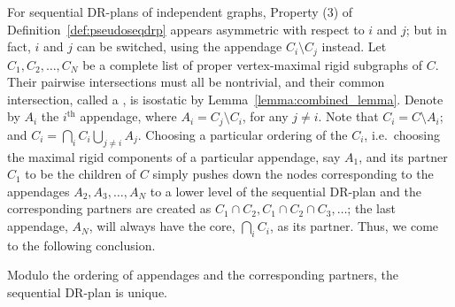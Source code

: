 For sequential DR-plans of independent graphs, Property (3) of Definition~\ref{def:pseudoseqdrp} appears asymmetric with respect to $i$ and $j$; but in fact, $i$ and $j$ can be switched, using the appendage $C_i\setminus C_j$ instead. Let $C_1, C_2, \ldots, C_N$ be a complete list of proper vertex-maximal rigid subgraphs of $C$. Their pairwise intersections must all be nontrivial, and their common intersection, called a , is isostatic by Lemma~\ref{lemma:combined_lemma}. Denote by $A_i$ the $i^\text{th}$ appendage, where $A_i = C_j\setminus C_i$, for any $j\neq i$. Note that $C_i = C\setminus A_i$; and $C_i = \bigcap_i{C_i} \bigcup_{j\ne i}{A_j}$. Choosing a particular ordering of the $C_i$, i.e.\ choosing the maximal rigid components of a particular appendage, say $A_1$, and its partner $C_1$ to be the children of $C$ simply pushes down the nodes corresponding to the appendages $A_2, A_3, \ldots, A_N$ to a lower level of the sequential DR-plan and the corresponding partners are created as $C_1\cap C_2, C_1\cap C_2\cap C_3, \ldots$; the last appendage, $A_N$, will always have the core, $\bigcap_i{C_i}$, as its partner. Thus, we come to the following conclusion.

\begin{remark}
\label{remark:seq_is_essentially_unique}
    Modulo the ordering of appendages and the corresponding partners, the sequential DR-plan is unique.
\end{remark}



\ClearMyMinHeight
{}

